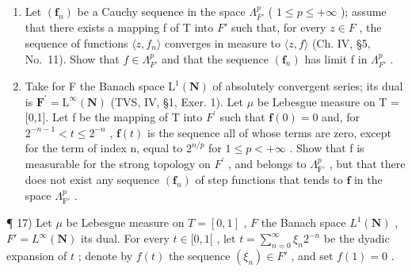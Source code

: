 \begin{enumerate}
\def\labelenumi{\alph{enumi})}
\setcounter{enumi}{5}
\item
  Let \((\mathbf{f}_{n})\) be a Cauchy sequence in the space \(\Lambda_{F'}^{p}\) ( \(1 \leqslant p \leqslant +\infty\) ); assume that there exists a mapping f of T into \(F'\) such that, for every \(z \in F\) , the sequence of functions \(\langle z, f_{n} \rangle\) converges in measure to \(\langle z, f \rangle\) (Ch. IV, §5, No.~11). Show that \(f \in \Lambda_{F'}^{p}\) and that the sequence \((\mathbf{f}_{n})\) has limit f in \(\Lambda_{F'}^{p}\) .
\item
  Take for F the Banach space \(\mathrm{L}^{1}(\mathbf{N})\) of absolutely convergent series; its dual is \(\mathbf{F}^{\prime} = \mathrm{L}^{\infty}(\mathbf{N})\) (TVS, IV, §1, Exer. 1). Let \(\mu\) be Lebesgue measure on T = {[}0,1{]}. Let f be the mapping of T into \(F^{\prime}\) such that \(\mathbf{f}(0) = 0\) and, for \(2^{-n-1} < t \leqslant 2^{-n}\) , \(\mathbf{f}(t)\) is the sequence all of whose terms are zero, except for the term of index n, equal to \(2^{n/p}\) for \(1 \leqslant p < +\infty\) . Show that f is measurable for the strong topology on \(F^{\prime}\) , and belongs to \(\Lambda_{\mathrm{F}'}^p\) , but that there does not exist any sequence \((\mathbf{f}_n)\) of step functions that tends to \(\mathbf{f}\) in the space \(\Lambda_{\mathrm{F}'}^p\) .
\end{enumerate}

¶ 17) Let \(\mu\) be Lebesgue measure on \(T = [0,1]\) , \(F\) the Banach space \(L^1(\mathbf{N})\) , \(F' = L^\infty(\mathbf{N})\) its dual. For every \(t \in [0,1[\) , let \(t = \sum_{n=0}^\infty \xi_n 2^{-n}\) be the dyadic expansion of \(t\) ; denote by \(f(t)\) the sequence \((\xi_n) \in F'\) , and set \(f(1) = 0\) .

